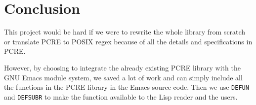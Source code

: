 \documentclass[12pt]{article}
\begin{document}
\section{Conclusion}

This project would be hard if we were to rewrite the whole library from scratch or translate PCRE to POSIX regex because of all the details and specifications in PCRE.

However, by choosing to integrate the already existing PCRE library with the GNU Emacs module system, we saved a lot of work and can simply include all the functions in the PCRE library in the Emacs source code. Then we use \texttt{DEFUN} and \texttt{DEFSUBR} to make the function available to the Lisp reader and the users.
\end{document}
